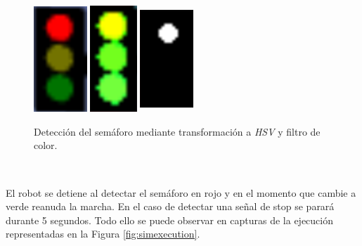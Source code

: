 \begin{figure} [h!]
	\begin{center}
		\includegraphics[width=2cm, height=4cm]{figs/cropped}\hspace{2cm}\includegraphics[width=2cm, height=4cm]{figs/hsv}\hspace{2cm}\includegraphics[width=2cm,
			height=4cm]{figs/mask}
	\end{center}
	\caption{Detección del semáforo mediante transformación a \textit{HSV} y filtro de color.}
	\label{fig:detector}
\end{figure}\

El robot se detiene al detectar el semáforo en rojo y en el momento que cambie a verde reanuda la marcha. En el caso de detectar una señal de stop se parará durante 5 segundos.
Todo ello se puede observar en capturas de la ejecución representadas en la Figura \ref{fig:simexecution}.\\

